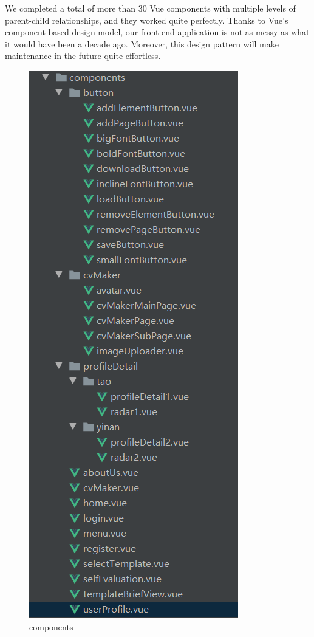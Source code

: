 \documentclass[11pt]{article}
\begin{document}
\begin{spacing}{1.0}
\begin{itemize}
	We completed a total of more than 30 Vue components with multiple levels of parent-child relationships, and they worked quite perfectly. Thanks to Vue's component-based design model, our front-end application is not as messy as what it would have been a decade ago. Moreover, this design pattern will make maintenance in the future  quite effortless.
	\begin{figure}[H]
		\centering
		\includegraphics[scale=.5]{figures/components.png}
		\caption{components}
		\label{fig:7}
	\end{figure}


\end{itemize}
\end{spacing}
\end{document}
